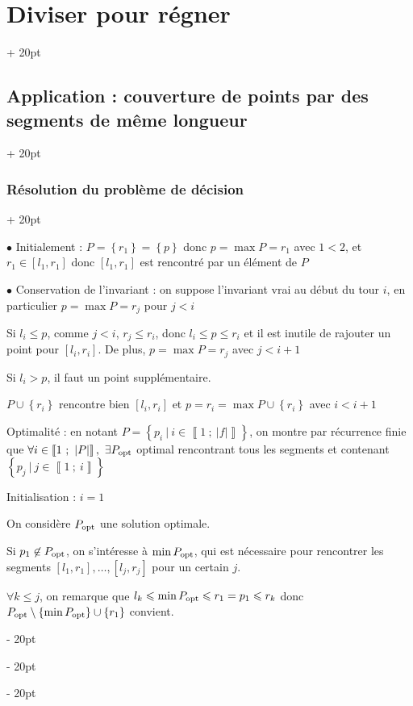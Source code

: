 \documentclass[a4paper, 12pt, twoside]{article}
\newcommand{\nset}[2]{\left\llbracket #1\ ;\ #2 \right\rrbracket}
\newcommand{\set}[1]{\left\{ #1 \right\}}
\newcommand{\abs}[1]{\left\lvert #1 \right\rvert} %
\renewcommand{\le}{\leqslant}
\newcommand{\ind}[1][20pt]{\advance\leftskip + #1}
\newcommand{\deind}[1][20pt]{\advance\leftskip - #1}
\newenvironment{indt}[2][20pt]{#2 \par \ind[#1]}{\par \deind} %
\begin{document}
\begin{indt}{\section{Diviser pour régner}}
\begin{indt}{\subsection{Application : couverture de points par des segments de même longueur}}
\begin{indt}{\subsubsection{Résolution du problème de décision}}
                \vspace{12pt}
                
                $\bullet$ Initialement : $P = \set{r_1} = \set p$ donc $p = \max P = r_1$ avec $1 < 2$, et $r_1 \in [l_1, r_1]$ donc $[l_1, r_1]$ est rencontré par un élément de $P$
                
                \vspace{6pt}
                
                $\bullet$ Conservation de l'invariant : on suppose l'invariant vrai au début du tour $i$, en particulier $p = \max P = r_j$ pour $j < i$
                
                Si $l_i \le p$, comme $j < i$, $r_j \le r_i$, donc $l_i \le p \le r_i$ et il est inutile de rajouter un point pour $[l_i, r_i]$. De plus, $p = \max P = r_j$ avec $j < i + 1$
                
                Si $l_i > p$, il faut un point supplémentaire.
                
                $P \cup \set{r_i}$ rencontre bien $[l_i, r_i]$ et $p = r_i = \max P \cup \set{r_i}$ avec $i < i + 1$
                
                \vspace{12pt}
                
                Optimalité : en notant $P = \set{p_i\ |\ i \in \nset{1}{\abs f}}$, on montre par récurrence finie que $\forall i \in \nset{1}{\abs P},\ \exists P_{\rm opt}$ optimal rencontrant tous les segments et contenant $\set{p_j\ |\ j \in \nset 1 i}$
                
                \vspace{6pt}
                
                Initialisation : $i = 1$
                
                On considère $P_{\rm opt}$ une solution optimale.
                
                Si $p_1 \not \in P_{\rm opt}$, on s'intéresse à $\min P_{\rm opt}$, qui est nécessaire pour rencontrer les segments $[l_1, r_1], \ldots, [l_j, r_j]$ pour un certain $j$.
                
                $\forall k \le j$, on remarque que $l_k \le \min P_{\rm opt} \le r_1 = p_1 \le r_k$ donc $P_{\rm opt} \setminus \set{\min P_{\rm opt}} \cup \set{r_1}$ convient.
                
                \vspace{6pt}
                

\end{indt}
\end{indt}
\end{indt}
\end{document}

